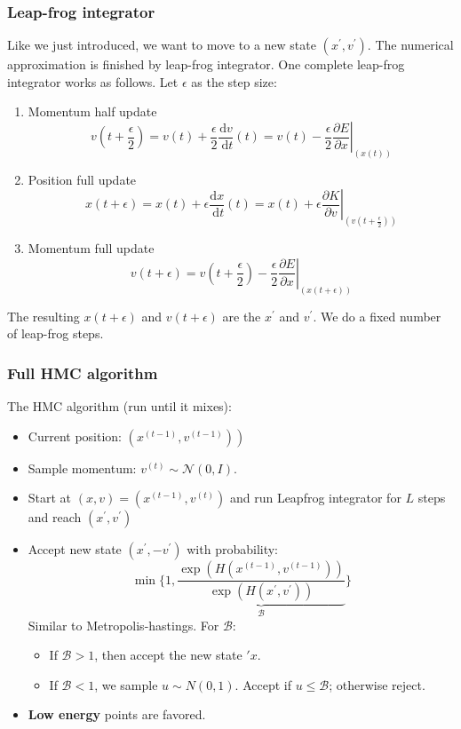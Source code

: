 \subsubsection*{Leap-frog integrator}
Like we just introduced, we want to move to a new state $(x^\prime,v^\prime)$. The numerical approximation is finished by leap-frog integrator. One complete leap-frog integrator works as follows. Let $\epsilon$ as the step size:
\begin{enumerate}
    \item Momentum half update
    $$v\left(t+\frac{\epsilon}{2}\right)=v(t)+\frac{\epsilon}{2} \frac{\mathrm{d} v}{\mathrm{~d} t}(t)=v(t)-\frac{\epsilon}{2}\left. \frac{\partial E}{\partial x}\right|_{(x(t))}$$
    \item Position full update 
    $$x(t+\epsilon)=x(t)+\epsilon \frac{\mathrm{d} x}{\mathrm{~d} t}(t)=x(t)+\epsilon \left.\frac{\partial K}{\partial v}\right|_{\left(v\left(t+\frac{\epsilon}{2}\right)\right)}$$
    \item Momentum full update
    $$v(t+\epsilon)=v\left(t+\frac{\epsilon}{2}\right)-\frac{\epsilon}{2} \left.\frac{\partial E}{\partial x}\right|_{(x(t+\epsilon))}$$
\end{enumerate}
The resulting $x(t+\epsilon)$ and $v(t+\epsilon)$ are the $x^\prime$ and $v^\prime$. We do a fixed number of leap-frog steps.
\subsubsection*{Full HMC algorithm}
The HMC algorithm (run until it mixes):
\begin{itemize}
    \item Current position: $\left.\left(x^{(t-1)}, v^{(t-1)}\right)\right)$
    \item Sample momentum: $v^{(t)} \sim \mathcal{N}(0, I)$.
    \item Start at $(x, v)=\left(x^{(t-1)}, v^{(t)}\right)$ and run Leapfrog integrator for $L$ steps and reach $\left(x^{\prime}, v^{\prime}\right)$
    \item Accept new state $\left(x^{\prime},-v^{\prime}\right)$ with probability:
    $$
    \min \Biggl\{1, \underbrace{\frac{\exp \left(H\left(x^{(t-1)}, v^{(t-1)}\right)\right)}{\exp \left(H\left(x^{\prime}, v^{\prime}\right)\right)}}_{\mathcal{B}}\Biggl\}
    $$
    Similar to Metropolis-hastings. For $\mathcal{B}$:
    \begin{itemize}
        \item If $\mathcal{B}>1$, then accept the new state $\prime{x}$.
        \item If $\mathcal{B}<1$, we sample $u\sim N(0,1)$. Accept if $u\leq\mathcal{B}$; otherwise reject.
    \end{itemize}
    \item \textbf{Low energy} points are favored.
\end{itemize}

